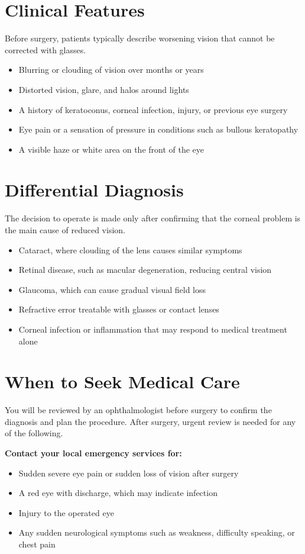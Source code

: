 \section*{Clinical Features}
Before surgery, patients typically describe worsening vision that cannot be corrected with glasses.

\begin{itemize}
    \item Blurring or clouding of vision over months or years
    \item Distorted vision, glare, and halos around lights
    \item A history of keratoconus, corneal infection, injury, or previous eye surgery
    \item Eye pain or a sensation of pressure in conditions such as bullous keratopathy
    \item A visible haze or white area on the front of the eye
\end{itemize}

\section*{Differential Diagnosis}
The decision to operate is made only after confirming that the corneal problem is the main cause of reduced vision.

\begin{itemize}
    \item Cataract, where clouding of the lens causes similar symptoms
    \item Retinal disease, such as macular degeneration, reducing central vision
    \item Glaucoma, which can cause gradual visual field loss
    \item Refractive error treatable with glasses or contact lenses
    \item Corneal infection or inflammation that may respond to medical treatment alone
\end{itemize}

\section*{When to Seek Medical Care}
You will be reviewed by an ophthalmologist before surgery to confirm the diagnosis and plan the procedure. After surgery, urgent review is needed for any of the following.

\textbf{Contact your local emergency services for:}
\begin{itemize}
    \item Sudden severe eye pain or sudden loss of vision after surgery
    \item A red eye with discharge, which may indicate infection
    \item Injury to the operated eye
    \item Any sudden neurological symptoms such as weakness, difficulty speaking, or chest pain
\end{itemize}

